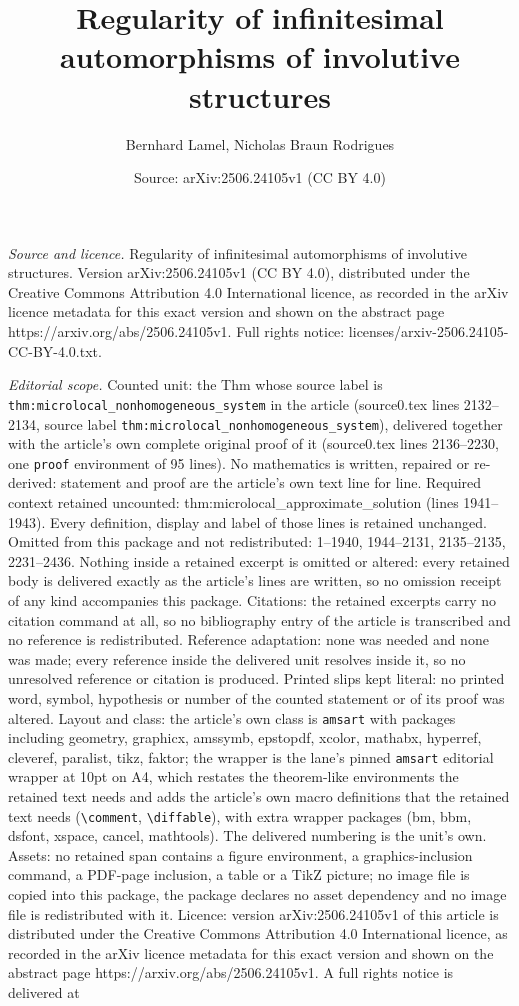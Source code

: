 \documentclass[10pt,a4paper]{amsart}
\title[Regularity of infinitesimal automorphisms of involutive stru]{Regularity of infinitesimal automorphisms of involutive structures}
\author{Bernhard Lamel, Nicholas Braun Rodrigues}
\date{Source: arXiv:2506.24105v1 (CC BY 4.0)}
\begin{document}
\maketitle

\noindent\emph{Source and licence.} Regularity of infinitesimal automorphisms of involutive structures. Version arXiv:2506.24105v1 (CC BY 4.0), distributed under the Creative Commons Attribution 4.0 International licence, as recorded in the arXiv licence metadata for this exact version and shown on the abstract page https://arxiv.org/abs/2506.24105v1. Full rights notice: licenses/arxiv-2506.24105-CC-BY-4.0.txt.\par\smallskip

\noindent\textit{Editorial scope.} Counted unit: the Thm whose source label is \texttt{thm:microlocal\_nonhomogeneous\_system} in the article (source0.tex lines 2132--2134, source label \texttt{thm:microlocal\_nonhomogeneous\_system}), delivered together with the article's own complete original proof of it (source0.tex lines 2136--2230, one \texttt{proof} environment of 95 lines). No mathematics is written, repaired or re-derived: statement and proof are the article's own text line for line. Required context retained uncounted: thm:microlocal\_approximate\_solution (lines 1941--1943). Every definition, display and label of those lines is retained unchanged. Omitted from this package and not redistributed: 1--1940, 1944--2131, 2135--2135, 2231--2436. Nothing inside a retained excerpt is omitted or altered: every retained body is delivered exactly as the article's lines are written, so no omission receipt of any kind accompanies this package. Citations: the retained excerpts carry no citation command at all, so no bibliography entry of the article is transcribed and no reference is redistributed. Reference adaptation: none was needed and none was made; every reference inside the delivered unit resolves inside it, so no unresolved reference or citation is produced. Printed slips kept literal: no printed word, symbol, hypothesis or number of the counted statement or of its proof was altered. Layout and class: the article's own class is \texttt{amsart} with packages including geometry, graphicx, amssymb, epstopdf, xcolor, mathabx, hyperref, cleveref, paralist, tikz, faktor; the wrapper is the lane's pinned \texttt{amsart} editorial wrapper at 10pt on A4, which restates the theorem-like environments the retained text needs and adds the article's own macro definitions that the retained text needs (\texttt{\textbackslash comment}, \texttt{\textbackslash diffable}), with extra wrapper packages (bm, bbm, dsfont, xspace, cancel, mathtools). The delivered numbering is the unit's own. Assets: no retained span contains a figure environment, a graphics-inclusion command, a PDF-page inclusion, a table or a TikZ picture; no image file is copied into this package, the package declares no asset dependency and no image file is redistributed with it. Licence: version arXiv:2506.24105v1 of this article is distributed under the Creative Commons Attribution 4.0 International licence, as recorded in the arXiv licence metadata for this exact version and shown on the abstract page https://arxiv.org/abs/2506.24105v1. A full rights notice is delivered at 
\end{document}
